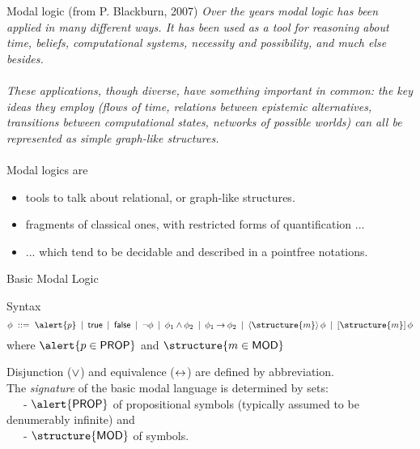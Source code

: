 \documentclass[aspectratio=169]{beamer}
\begin{document}
\begin{slide}{Modal logic (from P. Blackburn, 2007)}\label{s:9}
\small
\emph{Over the years modal logic has been applied in many different ways. It has been used as a tool for reasoning about \alert{time, beliefs, computational systems, necessity} and \alert{possibility}, and much else besides. \\
~\\

These applications, though diverse, have something important in common: the key ideas they employ (flows of time, relations between epistemic alternatives, transitions between computational states, networks of possible worlds) can all be represented as \alert{simple graph-like structures}.  }
~\\
~\\

Modal logics are
\begin{itemize}
\item  \alert{tools to talk about relational, or graph-like structures}.
\item  \alert{fragments of classical ones}, with restricted forms of quantification ...
\item  ... which tend to be \alert{decidable} and described in a pointfree notations.
\end{itemize}
\end{slide}



\begin{slide}{Basic Modal Logic}\label{s:10}
\small
\begin{block}{Syntax}
\begin{equation*}
\phi\; ::=\; \alert{p} \: \mid\: \true\: \mid\: \false\: \mid\: \neg \phi \: \mid\: \phi_1 \e \phi_2\: \mid\:
           \phi_1 \impp  \phi_2\:   \mid\:
           \pv{\structure{m}}{\phi} \:  \mid\:
           \nc{\structure{m}}{\phi} 
\end{equation*}
where $\alert{p \in \mathsf{PROP}}$ and $\structure{m \in \mathsf{MOD}}$
\end{block}
\vspace{1cm}

Disjunction ($\mathbin{\vee}$) and equivalence ($\mathbin{\leftrightarrow}$) are defined by abbreviation.
\\
The \emph{signature} of the basic modal language is determined by sets:
\\~~~- $\alert{\mathsf{PROP}}$ of \alert{propositional} symbols (typically assumed to be denumerably infinite) and
\\~~~- $\structure{\mathsf{MOD}}$ of  symbols.
\end{slide}
\end{document}
